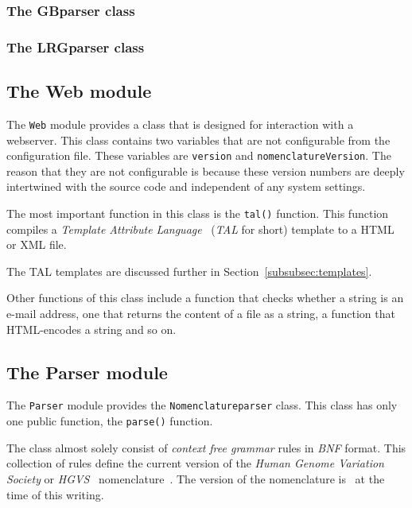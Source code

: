 \documentclass{article}
\begin{document}
\subsubsection{The GBparser class} \label{subsubsec:gbparser}

\subsubsection{The LRGparser class} \label{subsubsec:lrgparser}

\subsection{The Web module} \label{subsec:web}
The \texttt{Web} module provides a class that is designed for interaction with
a webserver. This class contains two variables that are not configurable from
the configuration file. These variables are \texttt{version} and
\texttt{nomenclatureVersion}. The reason that they are not configurable is 
because these version numbers are deeply intertwined with the source code and
independent of any system settings.

The most important function in this class is the \texttt{tal()} function. This
function compiles a \emph{Template Attribute Language}~\cite{TAL} (\emph{TAL}
for short) template to a HTML or XML file. %

The TAL templates are discussed further in Section~\ref{subsubsec:templates}.

Other functions of this class include a function that checks whether a string
is an e-mail address, one that returns the content of a file as a string, a
function that HTML-encodes a string and so on.

\subsection{The Parser module} \label{subsec:parser}
The \texttt{Parser} module provides the \texttt{Nomenclatureparser} class. This
class has only one public function, the \texttt{parse()} function.

The class almost solely consist of \emph{context free grammar} rules in
\emph{BNF} format. This collection of rules define the current version of the
\emph{Human Genome Variation Society} or \emph{HGVS}~\cite{HGVS}
nomenclature~\cite{NOM1, NOM2, NOM3, NOM4, NOM5, NOM6, NOM7}. The version of
the nomenclature is \nomenclatureversion\ at the time of this writing.
\end{document}
